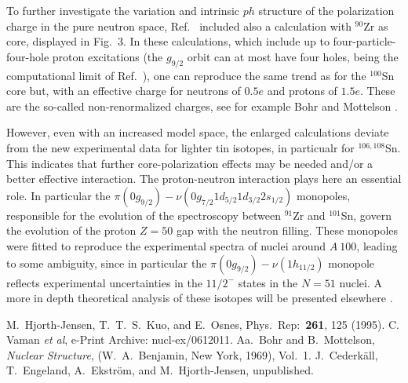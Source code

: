 \documentclass[prc]{revtex4}
\begin{document}
To further investigate the variation and intrinsic $ph$ structure
of the polarization charge in the pure neutron space, 
Ref.~\cite{banu} included also a calculation with $^{90}$Zr as core, displayed
in Fig.~3.  In these calculations, which include up to four-particle-four-hole
proton excitations (the $g_{9/2}$ orbit can at most have four holes, being the computational
limit of Ref.~\cite{banu}), 
one can reproduce the same trend as 
for the $^{100}$Sn core but, with an effective charge for neutrons of $0.5e$ and
protons of $1.5e$. These are 
the so-called non-renormalized charges, see for example Bohr and Mottelson \cite{bm69}.  

However, even with an increased model space, the enlarged calculations deviate from the new
experimental data for lighter tin isotopes, in particualr for 
$^{106,108}$Sn. This indicates that further core-polarization effects may be
needed and/or a better effective interaction.
The proton-neutron interaction plays here an essential role. In
particular the
$\pi(0g_{9/2})-\nu(0g_{7/2}1d_{5/2}1d_{3/2}2s_{1/2})$ monopoles,
responsible for the evolution of the spectroscopy between
$^{91}$Zr and $^{101}$Sn, govern the evolution of the proton
$Z=50$ gap with the neutron filling. These monopoles were fitted to reproduce
the experimental spectra of nuclei around $A~100$, leading to some ambiguity,
since in particular 
the $\pi (0g_{9/2}) - \nu (1h_{11/2})$ monopole reflects
experimental uncertainties in the $11/2^-$ states in the $N=51$
nuclei. A more in depth  theoretical analysis of these isotopes will be presented elsewhere 
\cite{joakim2007}.


\begin{thebibliography}{100}
 M.~Hjorth-Jensen, T.~T.~S.~Kuo, and E.~Osnes,
Phys.~Rep:~{\bf 261}, 125 (1995).
 C. Vaman {\em et al}, 
e-Print Archive: nucl-ex/0612011.
 Aa.~Bohr and B.~Mottelson, {\em Nuclear Structure}, (W.~A.~Benjamin, New York, 1969), Vol.~1.
 J.~Cederk\"all, T.~Engeland, A.~Ekstr\"om, and M.~Hjorth-Jensen, unpublished.
\end{thebibliography}
\end{document}
